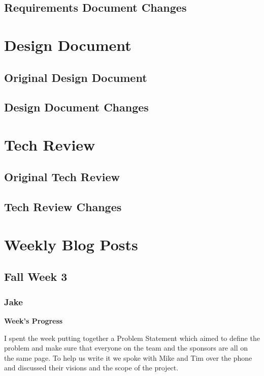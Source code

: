 \documentclass[10pt,journal,compsoc,onecolumn, draftclsnofoot]{IEEEtran}
\begin{document}
\subsection{Requirements Document Changes}

\section{Design Document}
\subsection{Original Design Document}


\subsection{Design Document Changes}

\section{Tech Review}
\subsection{Original Tech Review}


\subsection{Tech Review Changes}

\section{Weekly Blog Posts}

\subsection{Fall Week 3}
\subsubsection{Jake}
\noindent \textbf{Week's Progress}

I spent the week putting together a Problem Statement which aimed to define the problem and make sure that everyone on the team and the sponsors are all on the same page. To help us write it we spoke with Mike and Tim over the phone and discussed their visions and the scope of the project.
\end{document}
